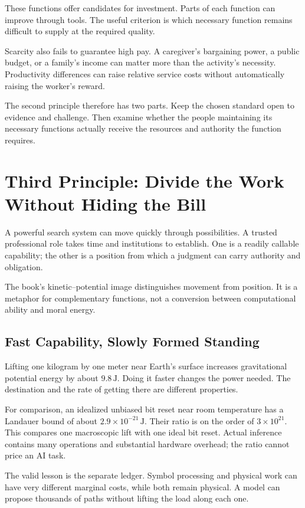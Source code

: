 \documentclass[11pt,openany]{book}
\begin{document}
These functions offer candidates for investment. Parts of each function can improve through tools. The useful criterion is which necessary function remains difficult to supply at the required quality.

Scarcity also fails to guarantee high pay. A caregiver's bargaining power, a public budget, or a family's income can matter more than the activity's necessity. Productivity differences can raise relative service costs without automatically raising the worker's reward.

The second principle therefore has two parts. Keep the chosen standard open to evidence and challenge. Then examine whether the people maintaining its necessary functions actually receive the resources and authority the function requires.

\section{Third Principle: Divide the Work Without Hiding the Bill}

A powerful search system can move quickly through possibilities. A trusted professional role takes time and institutions to establish. One is a readily callable capability; the other is a position from which a judgment can carry authority and obligation.

The book's kinetic--potential image distinguishes movement from position. It is a metaphor for complementary functions, not a conversion between computational ability and moral energy.

\subsection{Fast Capability, Slowly Formed Standing}

Lifting one kilogram by one meter near Earth's surface increases gravitational potential energy by about $9.8\,\mathrm J$. Doing it faster changes the power needed. The destination and the rate of getting there are different properties.

For comparison, an idealized unbiased bit reset near room temperature has a Landauer bound of about $2.9\times10^{-21}\,\mathrm J$. Their ratio is on the order of $3\times10^{21}$. This compares one macroscopic lift with one ideal bit reset. Actual inference contains many operations and substantial hardware overhead; the ratio cannot price an AI task.

The valid lesson is the separate ledger. Symbol processing and physical work can have very different marginal costs, while both remain physical. A model can propose thousands of paths without lifting the load along each one.
\end{document}
